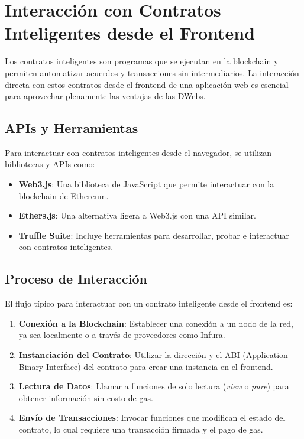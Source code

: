 \section{Interacción con Contratos Inteligentes desde el Frontend}

Los contratos inteligentes son programas que se ejecutan en la blockchain y permiten automatizar acuerdos y transacciones sin intermediarios. La interacción directa con estos contratos desde el frontend de una aplicación web es esencial para aprovechar plenamente las ventajas de las DWebs.

\subsection{APIs y Herramientas}

Para interactuar con contratos inteligentes desde el navegador, se utilizan bibliotecas y APIs como:

\begin{itemize}
    \item \textbf{Web3.js}: Una biblioteca de JavaScript que permite interactuar con la blockchain de Ethereum.
    \item \textbf{Ethers.js}: Una alternativa ligera a Web3.js con una API similar.
    \item \textbf{Truffle Suite}: Incluye herramientas para desarrollar, probar e interactuar con contratos inteligentes.
\end{itemize}

\subsection{Proceso de Interacción}

El flujo típico para interactuar con un contrato inteligente desde el frontend es:

\begin{enumerate}
    \item \textbf{Conexión a la Blockchain}: Establecer una conexión a un nodo de la red, ya sea localmente o a través de proveedores como Infura.
    \item \textbf{Instanciación del Contrato}: Utilizar la dirección y el ABI (Application Binary Interface) del contrato para crear una instancia en el frontend.
    \item \textbf{Lectura de Datos}: Llamar a funciones de solo lectura (\textit{view} o \textit{pure}) para obtener información sin costo de gas.
    \item \textbf{Envío de Transacciones}: Invocar funciones que modifican el estado del contrato, lo cual requiere una transacción firmada y el pago de gas.
\end{enumerate}

